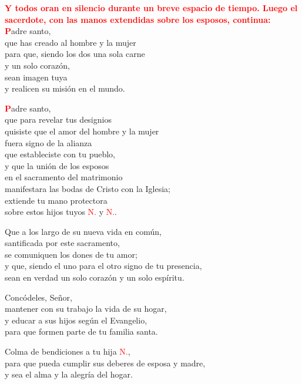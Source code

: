 \documentclass[12pt, letterpaper]{report}
\begin{document}
\large{\bfseries \textcolor{red}{Y todos oran en silencio durante un breve espacio de tiempo. Luego el sacerdote, con las manos extendidas sobre los esposos, continua:}} \newline \\

\lettrine[lines=1]{\bfseries \textcolor{red}{P}}{}\Large adre santo, \\
que has creado al hombre y la mujer \\
para que, siendo los dos una sola carne \\
y un solo coraz\'on, \\
sean imagen tuya \\
y realicen su misi\'on en el mundo.

\lettrine[lines=1]{\bfseries \textcolor{red}{P}}{}\Large adre santo, \\
que para revelar tus designios \\
quisiste que el amor del hombre y la mujer \\
fuera signo de la alianza \\
que estableciste con tu pueblo, \\
y que la uni\'on de los esposos \\
en el sacramento del matrimonio \\
manifestara las bodas de Cristo con la Iglesia; \\
extiende tu mano protectora \\
sobre estos hijos tuyos \textcolor{red}{N.} y \textcolor{red}{N.}. \newline

Que a los largo de su nueva vida en com\'un, \\
santificada por este sacramento, \\
se comuniquen los dones de tu amor; \\
y que, siendo el uno para el otro signo de tu presencia, \\
sean en verdad un solo coraz\'on y un solo esp\'iritu. \newline

Conc\'odeles, Se\~nor, \\
mantener con su trabajo la vida de su hogar, \\
y educar a sus hijos seg\'un el Evangelio, \\
para que formen parte de tu familia santa. \newline

Colma de bendiciones a tu hija \textcolor{red}{N.}, \\
para que pueda cumplir sus deberes de esposa y madre, \\
y sea el alma y la alegr\'ia del hogar. \newline
\end{document}
